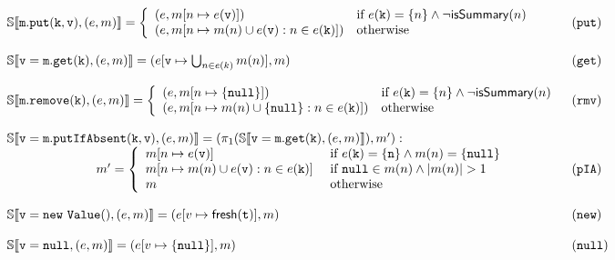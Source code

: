 \begin{figure*}
\[
\begin{array}{ll}
\mathbb{S}\llbracket \mathtt{m.put(k, v)}, (e, m) \rrbracket = \left\{
\begin{array}{ll}
(e, m[n \mapsto e(\mathtt{v})]) & \textrm{if } e(\mathtt{k})=\{n\} \land \neg \mathsf{isSummary}(n)\\
(e, m[n \mapsto m(n) \cup e(\mathtt{v}) : n \in e(\mathtt{k})]) & \textrm{otherwise}\\
\end{array}
\right. & (\mathtt{put})\\
\\
\mathbb{S}\llbracket \mathtt{v=m.get(k)}, (e, m) \rrbracket = (e[\mathtt{v} \mapsto \bigcup_{n \in e(k)} m(n)], m) & (\mathtt{get})\\
\\
\mathbb{S}\llbracket \mathtt{m.remove(k)}, (e, m) \rrbracket =  \left\{
\begin{array}{ll}
(e, m[n \mapsto \{\mathtt{null}\}]) & \textrm{if } e(\mathtt{k})=\{n\} \land \neg \mathsf{isSummary}(n)\\
(e, m[n \mapsto m(n) \cup \{\mathtt{null}\} : n \in e(\mathtt{k})]) & \textrm{otherwise}\\
\end{array}
\right. & (\mathtt{rmv})\\ 
\\
\mathbb{S}\llbracket \mathtt{v = m.putIfAbsent(k, v)}, (e, m) \rrbracket =  (\pi_1(\mathbb{S}\llbracket \mathtt{v = m.get(k)}, (e, m) \rrbracket), m') : & \\
\hspace{70pt} 
m'=
\left\{
\begin{array}{ll}
m[n \mapsto e(\mathtt{v})] & \textrm{ if } e(\mathtt{k})=\{\mathtt{n}\} \land m(n) = \{\mathtt{null}\}\\
m[n \mapsto m(n) \cup e(\mathtt{v}) : n \in e(\mathtt{k})] & \textrm{ if } \mathtt{null} \in m(n) \land |m(n)| > 1\\
m & \textrm{ otherwise}\\
\end{array}
\right. & (\mathtt{pIA})\\
\\
\mathbb{S}\llbracket \mathtt{v = new\ Value()}, (e, m) \rrbracket =  (e[v \mapsto \mathsf{fresh}(\mathtt{t})], m)& (\mathtt{new})\\
\\
\mathbb{S}\llbracket \mathtt{v = null}, (e, m) \rrbracket =  (e[v \mapsto \{\mathtt{null}\}], m)& (\mathtt{null})\\

\end{array}\]
\end{figure*}
